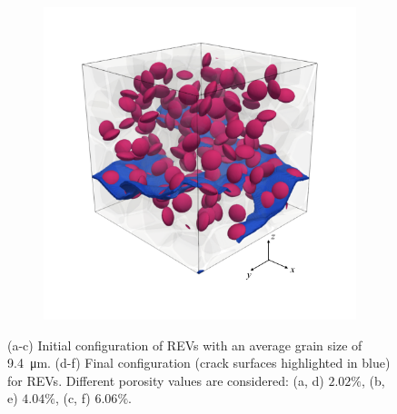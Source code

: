 \begin{figure}[!htb]
\begin{subfigure}{0.32\textwidth}
    \caption{}
    \label{b100_end}
  \end{subfigure}
  \begin{subfigure}{0.32\textwidth}
    \centering
    \includegraphics[width=\textwidth]{Chapter3/figures/b150_end}
    \caption{}
    \label{b150_end}
  \end{subfigure}
  \caption[Crack propagation in REVs with different porosity values.]{ (a-c) Initial configuration of REVs with an average grain size of \SI{9.4}{\micro\meter}. (d-f) Final configuration (crack surfaces highlighted in blue) for REVs. Different porosity values are considered: (a, d) $2.02\%$, (b, e) $4.04\%$, (c, f) $6.06\%$. }
  \label{ini_final_porosity}
\end{figure}

